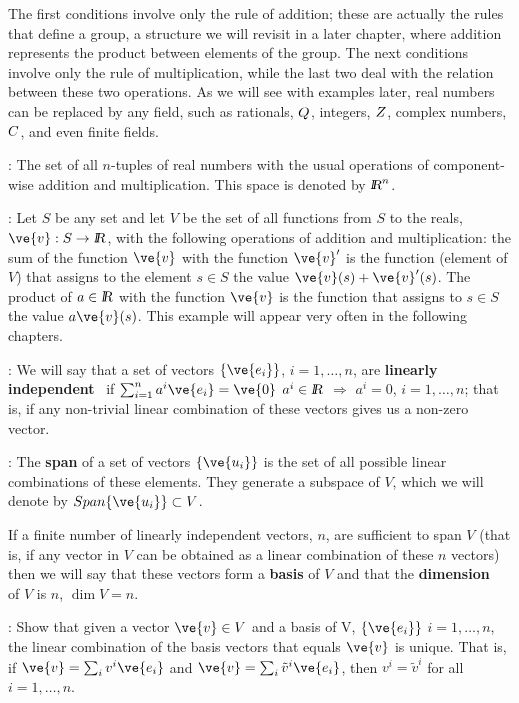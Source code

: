The first conditions involve only the rule of addition; these are actually the rules that 
define a group, a structure we will revisit in a later chapter, where addition represents the product between elements of the group.
The next conditions involve only the rule of multiplication, while
the last two deal with the relation between these two operations. As we will see with examples later, real numbers can be replaced by any field, such as rationals, $Q$, integers, $Z$, complex numbers, $C$, and even finite fields.

\espa

\ejem: The set of all $n$-tuples of real numbers with the
usual operations of component-wise addition and multiplication.
This space is denoted by $\mbox{\sl {l$\!\!\!\;\:\!$R}}^n$.

\ejem: Let $S$ be any set and let $V$ be the set of all functions
from $S$ to the reals, $\ve{v}:S \to \re$, with the following
operations of addition and multiplication: the sum of the function $\ve{v}$ with
the function $\ve{v}'$ is the function (element of $V$) that assigns to the element
$s \in S$ the value $\ve{v}(s) + \ve{v}'(s)$. The product of
$a \in \mbox{\sl {l$\!\!\!\;\:\!$R}}$ with the function $\ve{v}$ is the function that assigns to $s \in S$
the value $a\ve{v}(s)$.
This example will appear very often in the following chapters.

: We will say that a set of vectors $\{\ve{e_i}\}$, $i=1, \ldots ,n$,
are {\bf linearly independent}~ 
if $\sum_{i=1}^{n} a^i \ve{e_i} = \ve{0}$ $a^i \in \mbox{\sl {l$\!\!\!\;\:\!$R}}$ $\Longrightarrow $ $a^i = 0$, $i= 1, \ldots ,n$;
that is, if any non-trivial linear combination of these vectors gives us a non-zero vector. 

: The {\bf span} of a set of vectors $\{\ve{u_{i}}\}$ is the set of all possible linear combinations of these elements. They generate a subspace of $V$, which we will denote by $Span\{\ve{u_{i}}\}\subset V$. 

If a finite number of linearly independent vectors, 
$n$, are sufficient to span $V$ (that is, if 
any vector in $V$ can be obtained as a linear combination of 
these $n$ vectors) then we will say that these vectors form a {\bf basis} of 
$V$ and that the {\bf dimension}~ of $V$ is $n$, $\dim V = n$.
\espa

\ejer: Show that given a vector $\ve{v} \in V$ and a basis of V, $\{\ve{e_i}\}$ $i=1, \ldots ,n$, the linear combination of the basis vectors that equals $\ve{v}$ is unique. That is, if 
$\ve{v} =  \sum_i v^i \ve{e_i} $ and $\ve{v} = \sum_i \tilde{v}^i \ve{e_i} $, then $v^i=\tilde{v}^i$ for all
$i=1, \ldots ,n$.

